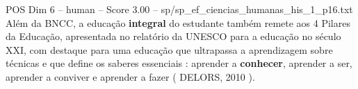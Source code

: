 \begin{textsample}{POS Dim 6 – human – Score 3.00 – sp/sp\_ef\_ciencias\_humanas\_his\_1\_p16.txt}  \label{ex:f6_pos_009}
Além da BNCC, a educação \textbf{integral} do estudante também remete aos 4 Pilares da Educação, apresentada no relatório da UNESCO para a educação no século XXI, com destaque para uma educação que ultrapassa a aprendizagem sobre técnicas e que define os saberes essenciais : aprender a \textbf{conhecer}, aprender a ser, aprender a conviver e aprender a fazer ( DELORS, 2010 ).

\end{textsample}
